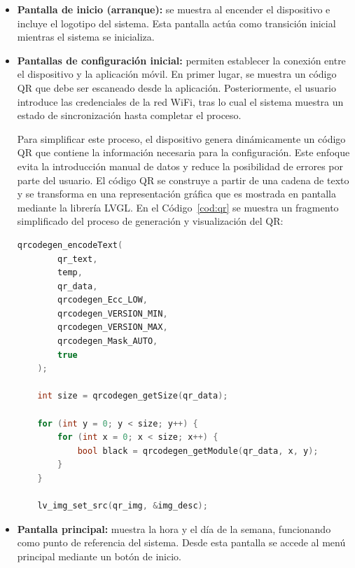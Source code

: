 \begin{itemize}

    \item \textbf{Pantalla de inicio (arranque):} se muestra al encender el dispositivo e incluye el logotipo del sistema. Esta pantalla actúa como transición inicial mientras el sistema se inicializa.

    \item \textbf{Pantallas de configuración inicial:} permiten establecer la conexión entre el dispositivo y la aplicación móvil. En primer lugar, se muestra un código QR que debe ser escaneado desde la aplicación. Posteriormente, el usuario introduce las credenciales de la red WiFi, tras lo cual el sistema muestra un estado de sincronización hasta completar el proceso.

    Para simplificar este proceso, el dispositivo genera dinámicamente un código QR que contiene la información necesaria para la configuración. Este enfoque evita la introducción manual de datos y reduce la posibilidad de errores por parte del usuario. El código QR se construye a partir de una cadena de texto y se transforma en una representación gráfica que es mostrada en pantalla mediante la librería LVGL. En el Código~\ref{cod:qr} se muestra un fragmento simplificado del proceso de generación y visualización del QR:

    \begin{code}[H]
    \begin{lstlisting}[language=C++]
    qrcodegen_encodeText(
        qr_text,
        temp,
        qr_data,
        qrcodegen_Ecc_LOW,
        qrcodegen_VERSION_MIN,
        qrcodegen_VERSION_MAX,
        qrcodegen_Mask_AUTO,
        true
    );

    int size = qrcodegen_getSize(qr_data);

    for (int y = 0; y < size; y++) {
        for (int x = 0; x < size; x++) {
            bool black = qrcodegen_getModule(qr_data, x, y);
        }
    }

    lv_img_set_src(qr_img, &img_desc);
    \end{lstlisting}
    \caption{Generación y renderizado de un código QR en el dispositivo}
    \label{cod:qr}
    \end{code}

    \item \textbf{Pantalla principal:} muestra la hora y el día de la semana, funcionando como punto de referencia del sistema. Desde esta pantalla se accede al menú principal mediante un botón de inicio.


\end{itemize}

